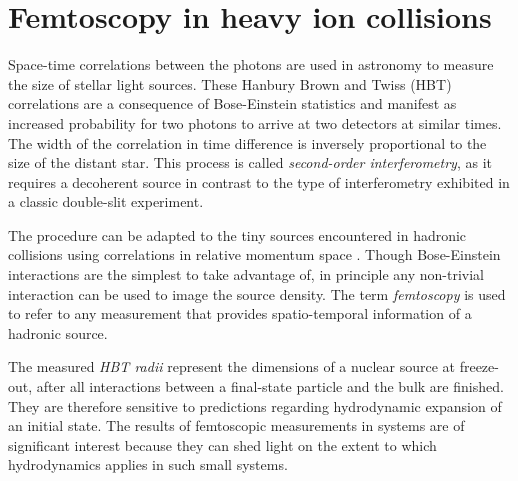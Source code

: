 \section{Femtoscopy in heavy ion collisions}

Space-time correlations between the photons are used in astronomy to measure the size of stellar light sources.
These Hanbury Brown and Twiss (HBT) correlations \cite{HanburyBrown:1954,HanburyBrown:1956} are a consequence of Bose-Einstein statistics and manifest as increased probability for two photons to arrive at two detectors at similar times.
The width of the correlation in time difference is inversely proportional to the size of the distant star.
This process is called \emph{second-order interferometry}, as it requires a decoherent source in contrast to the type of interferometry exhibited in a classic double-slit experiment.

The procedure can be adapted to the tiny sources encountered in hadronic collisions using correlations in relative momentum space \cite{Goldhaber:1960sf}.
Though Bose-Einstein interactions are the simplest to take advantage of, in principle any non-trivial interaction can be used to image the source density.
The term \emph{femtoscopy} is used to refer to any measurement that provides spatio-temporal information of a hadronic source.

The measured \emph{HBT radii} represent the dimensions of a nuclear source at freeze-out, after all interactions between a final-state particle and the bulk are finished.
They are therefore sensitive to predictions regarding hydrodynamic expansion of an initial state.
The results of femtoscopic measurements in \pPb systems are of significant interest because they can shed light on the extent to which hydrodynamics applies in such small systems.

